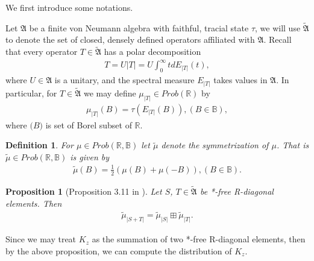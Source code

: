 \documentclass{amsart}
\newcommand{\AAA}{\mathfrak A}
\newcommand{\R}{\mathbb R}  %
\newtheorem{prop}{Proposition}[section]
\newtheorem{df}{Definition}[section]
\begin{document}
We first introduce some notations.

Let $\AAA$ be a finite von Neumann algebra with faithful, tracial state $\tau$, we will use $\widetilde{\AAA}$ to denote the set of
closed, densely defined operators affiliated with $\AAA$. Recall that every operator $T \in \widetilde{\AAA}$
has a polar decomposition
\begin{align*}
T = U|T| = U\int^{\infty}_{0} t dE_{|T|}(t),
\end{align*}
where $U \in \AAA$ is a unitary, and the spectral measure $E_{|T|}$ takes values in $\AAA$. In particular,
for $T \in \widetilde{\AAA}$ we may define $\mu_{|T|} \in Prob(\R)$ by
\begin{align*}
\mu_{|T|}(B) = \tau(E_{|T|}(B)),  (B \in \mathbb{B}),
\end{align*}
where $\mathbb(B)$ is set of Borel subset of $\R$.

\begin{df}
For $\mu \in Prob(\R, \mathbb{B})$ let $\widetilde{\mu}$ denote the symmetrization of $\mu$. That
is $\widetilde{\mu} \in Prob(\R, \mathbb{B})$ is given by
\begin{align*}
\widetilde{\mu}(B) = \frac{1}{2}(\mu(B) + \mu(-B)), (B \in \mathbb{B}).
\end{align*}
\end{df}

\begin{prop}[Proposition 3.11 in \cite{HH}]
Let $S$, $T \in \widetilde{\AAA}$ be *-free R-diagonal elements. Then
\begin{align*}
\widetilde{\mu}_{|S+T|} = \widetilde{\mu}_{|S|}\boxplus \widetilde{\mu}_{|T|}.
\end{align*}
\end{prop}

Since we may treat $K_z$ as the summation of two *-free R-diagonal elements, then by
the above proposition, we can compute the distribution of $K_z$.
\end{document}
